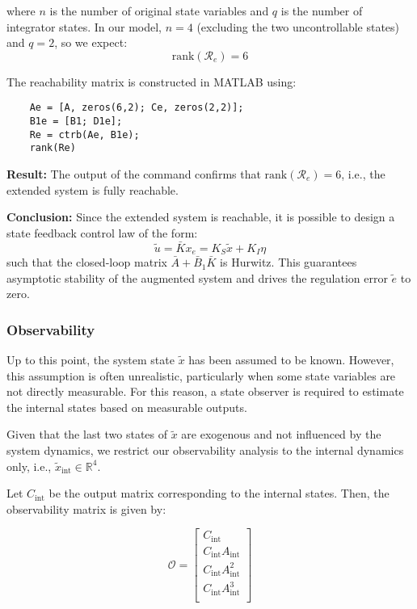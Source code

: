 \documentclass[]{report}
\begin{document}
where $n$ is the number of original state variables and $q$ is the number of integrator states. In our model, $n=4$ (excluding the two uncontrollable states) and $q=2$, so we expect:
\[
\text{rank}(\mathcal{R}_e) = 6
\]

The reachability matrix is constructed in MATLAB using:

\begin{verbatim}
	Ae = [A, zeros(6,2); Ce, zeros(2,2)];
	B1e = [B1; D1e];
	Re = ctrb(Ae, B1e);
	rank(Re)
\end{verbatim}

\textbf{Result:}  
The output of the command confirms that $\text{rank}(\mathcal{R}_e) = 6$, i.e., the extended system is fully reachable.

\textbf{Conclusion:}  
Since the extended system is reachable, it is possible to design a state feedback control law of the form:
\[
\tilde{u} = \bar{K} x_e = K_S \tilde{x} + K_I \eta
\]
such that the closed-loop matrix $\bar{A} + \bar{B}_1 \bar{K}$ is Hurwitz. This guarantees asymptotic stability of the augmented system and drives the regulation error $\tilde{e}$ to zero.



\subsubsection{Observability}

Up to this point, the system state $\tilde{x}$ has been assumed to be known. However, this assumption is often unrealistic, particularly when some state variables are not directly measurable. For this reason, a state observer is required to estimate the internal states based on measurable outputs.

Given that the last two states of $\tilde{x}$ are exogenous and not influenced by the system dynamics, we restrict our observability analysis to the internal dynamics only, i.e., $\tilde{x}_{\text{int}} \in \mathbb{R}^4$.

Let $C_{\text{int}}$ be the output matrix corresponding to the internal states. Then, the observability matrix is given by:

\[
\mathcal{O} = \begin{bmatrix}
	C_{\text{int}} \\
	C_{\text{int}} A_{\text{int}} \\
	C_{\text{int}} A_{\text{int}}^2 \\
	C_{\text{int}} A_{\text{int}}^3 \\
\end{bmatrix}
\]
\end{document}
